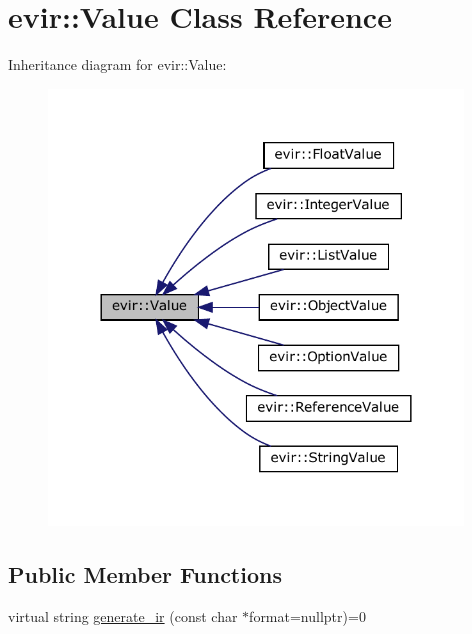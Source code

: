 \hypertarget{classevir_1_1Value}{}\section{evir\+:\+:Value Class Reference}
\label{classevir_1_1Value}


Inheritance diagram for evir\+:\+:Value\+:\nopagebreak
\begin{figure}[H]
\begin{center}
\leavevmode
\includegraphics[width=312pt]{classevir_1_1Value__inherit__graph}
\end{center}
\end{figure}
\subsection*{Public Member Functions}
\begin{DoxyCompactItemize}
\item 
virtual string \hyperlink{classevir_1_1Value_a3e7e5bc634fd5bba528324076fe2a763}{generate\+\_\+ir} (const char $\ast$format=nullptr)=0
\end{DoxyCompactItemize}
